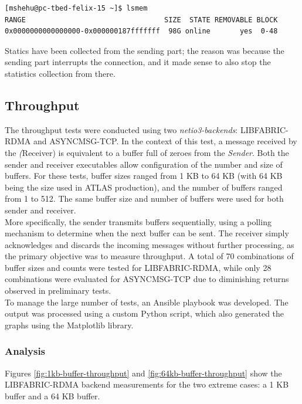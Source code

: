 \begin{lstlisting}[caption={Memory information}, label={lst:memory}]
[mshehu@pc-tbed-felix-15 ~]$ lsmem
RANGE                                 SIZE  STATE REMOVABLE BLOCK
0x0000000000000000-0x000000187fffffff  98G online       yes  0-48
\end{lstlisting}

Statics have been collected from the sending part; the reason was because the sending part interrupts the connection, and it made sense to also stop the statistics collection from there.

\subsection{Throughput}

The throughput tests were conducted using two \textit{netio3-backends}: LIBFABRIC-RDMA and ASYNCMSG-TCP. In the context of this test, a message received by the \emph(Receiver) is equivalent to a buffer full of zeroes from the \emph{Sender}. Both the sender and receiver executables allow configuration of the number and size of buffers. For these tests, buffer sizes ranged from 1 KB to 64 KB (with 64 KB being the size used in ATLAS production), and the number of buffers ranged from 1 to 512. The same buffer size and number of buffers were used for both sender and receiver.\\
More specifically, the sender transmits buffers sequentially, using a polling mechanism to determine when the next buffer can be sent. The receiver simply acknowledges and discards the incoming messages without further processing, as the primary objective was to measure throughput. A total of 70 combinations of buffer sizes and counts were tested for LIBFABRIC-RDMA, while only 28 combinations were evaluated for ASYNCMSG-TCP due to diminishing returns observed in preliminary tests.\\
To manage the large number of tests, an Ansible \cite{ansible} playbook was developed. The output was processed using a custom Python script, which also generated the graphs using the Matplotlib \cite{matplotlib} library.\\

\subsubsection{Analysis}

Figures \ref{fig:1kb-buffer-throughput} and \ref{fig:64kb-buffer-throughput} show the LIBFABRIC-RDMA backend measurements for the two extreme cases: a 1 KB buffer and a 64 KB buffer.

